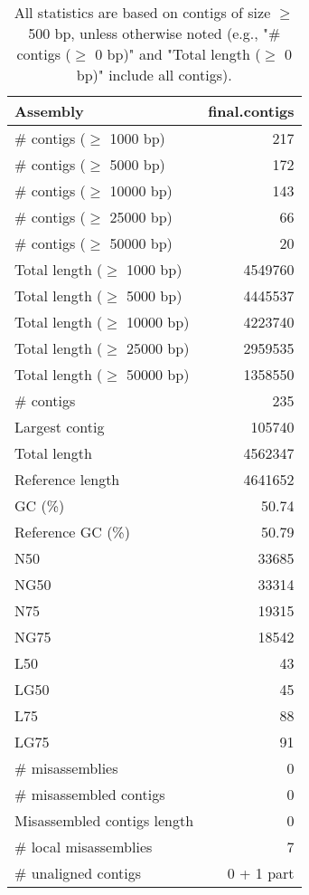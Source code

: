 \documentclass[12pt,a4paper]{article}
\begin{document}
\begin{table}[ht]
\begin{center}
\caption{All statistics are based on contigs of size $\geq$ 500 bp, unless otherwise noted (e.g., "\# contigs ($\geq$ 0 bp)" and "Total length ($\geq$ 0 bp)" include all contigs).}
\begin{tabular}{|l*{1}{|r}|}
\hline
Assembly & final.contigs \\ \hline
\# contigs ($\geq$ 1000 bp) & 217 \\ \hline
\# contigs ($\geq$ 5000 bp) & 172 \\ \hline
\# contigs ($\geq$ 10000 bp) & 143 \\ \hline
\# contigs ($\geq$ 25000 bp) & 66 \\ \hline
\# contigs ($\geq$ 50000 bp) & 20 \\ \hline
Total length ($\geq$ 1000 bp) & 4549760 \\ \hline
Total length ($\geq$ 5000 bp) & 4445537 \\ \hline
Total length ($\geq$ 10000 bp) & 4223740 \\ \hline
Total length ($\geq$ 25000 bp) & 2959535 \\ \hline
Total length ($\geq$ 50000 bp) & 1358550 \\ \hline
\# contigs & 235 \\ \hline
Largest contig & 105740 \\ \hline
Total length & 4562347 \\ \hline
Reference length & 4641652 \\ \hline
GC (\%) & 50.74 \\ \hline
Reference GC (\%) & 50.79 \\ \hline
N50 & 33685 \\ \hline
NG50 & 33314 \\ \hline
N75 & 19315 \\ \hline
NG75 & 18542 \\ \hline
L50 & 43 \\ \hline
LG50 & 45 \\ \hline
L75 & 88 \\ \hline
LG75 & 91 \\ \hline
\# misassemblies & 0 \\ \hline
\# misassembled contigs & 0 \\ \hline
Misassembled contigs length & 0 \\ \hline
\# local misassemblies & 7 \\ \hline
\# unaligned contigs & 0 + 1 part \\ \hline

\end{tabular}
\end{center}
\end{table}
\end{document}
